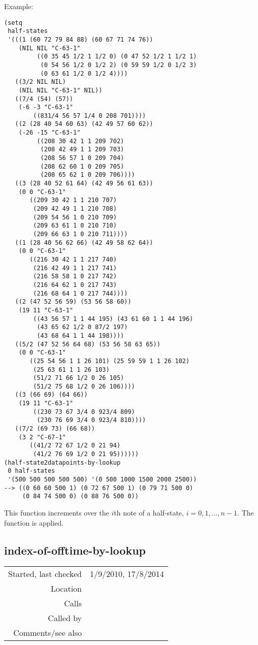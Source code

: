 \vspace{0.5cm}
\noindent Example:
\begin{verbatim}
(setq
 half-states
 '(((1 (60 72 79 84 88) (60 67 71 74 76))
    (NIL NIL "C-63-1"
         ((0 35 45 1/2 1 1/2 0) (0 47 52 1/2 1 1/2 1)
          (0 54 56 1/2 0 1/2 2) (0 59 59 1/2 0 1/2 3)
          (0 63 61 1/2 0 1/2 4))))
   ((3/2 NIL NIL)
    (NIL NIL "C-63-1" NIL))
   ((7/4 (54) (57))
    (-6 -3 "C-63-1"
        ((831/4 56 57 1/4 0 208 701))))
   ((2 (28 40 54 60 63) (42 49 57 60 62))
    (-26 -15 "C-63-1"
         ((208 30 42 1 1 209 702)
          (208 42 49 1 1 209 703)
          (208 56 57 1 0 209 704)
          (208 62 60 1 0 209 705)
          (208 65 62 1 0 209 706))))
   ((3 (28 40 52 61 64) (42 49 56 61 63))
    (0 0 "C-63-1"
       ((209 30 42 1 1 210 707)
        (209 42 49 1 1 210 708)
        (209 54 56 1 0 210 709)
        (209 63 61 1 0 210 710)
        (209 66 63 1 0 210 711))))
   ((1 (28 40 56 62 66) (42 49 58 62 64))
    (0 0 "C-63-1"
       ((216 30 42 1 1 217 740)
        (216 42 49 1 1 217 741)
        (216 58 58 1 0 217 742)
        (216 64 62 1 0 217 743)
        (216 68 64 1 0 217 744))))
   ((2 (47 52 56 59) (53 56 58 60))
    (19 11 "C-63-1" 
        ((43 56 57 1 1 44 195) (43 61 60 1 1 44 196)
         (43 65 62 1/2 0 87/2 197)
         (43 68 64 1 1 44 198))))
   ((5/2 (47 52 56 64 68) (53 56 58 63 65))
    (0 0 "C-63-1"
       ((25 54 56 1 1 26 101) (25 59 59 1 1 26 102)
        (25 63 61 1 1 26 103)
        (51/2 71 66 1/2 0 26 105)
        (51/2 75 68 1/2 0 26 106))))
   ((3 (66 69) (64 66))
    (19 11 "C-63-1"
        ((230 73 67 3/4 0 923/4 809)
         (230 76 69 3/4 0 923/4 810))))
   ((7/2 (69 73) (66 68))
    (3 2 "C-67-1"
       ((41/2 72 67 1/2 0 21 94)
        (41/2 76 69 1/2 0 21 95))))))
(half-state2datapoints-by-lookup
 0 half-states
 '(500 500 500 500 500) '(0 500 1000 1500 2000 2500))
--> ((0 60 60 500 1) (0 72 67 500 1) (0 79 71 500 0)
     (0 84 74 500 0) (0 88 76 500 0))
\end{verbatim}

\noindent This function increments over the $i$th note
of a half-state, $i = 0, 1,\ldots, n-1$. The function
 is
applied.


\subsection*{index-of-offtime-by-lookup}\label{fun:index-of-offtime-by-lookup}

\vspace{0.3cm}
\begin{tabular}{r|p{8cm}}
Started, last checked & 1/9/2010, 17/8/2014 \\
Location & \nameref{sec:realising-states} \\
Calls & \nameref{fun:nth-list-of-lists} \\
Called by & \nameref{fun:state-note2datapoint-by-lookup} \\
Comments/see also & \nameref{fun:index-of-offtime}
\end{tabular}


